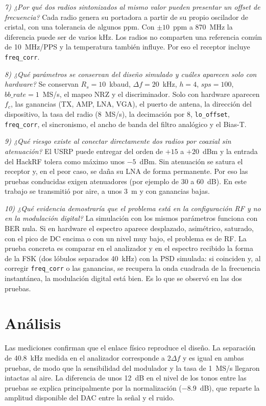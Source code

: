 \documentclass[conference]{IEEEtran}
\begin{document}
\textit{7) ¿Por qué dos radios sintonizados al mismo valor pueden presentar un offset de frecuencia?} Cada radio genera su portadora a partir de su propio oscilador de cristal, con una tolerancia de algunos ppm. Con $\pm 10$~ppm a 870~MHz la diferencia puede ser de varios kHz. Los radios no comparten una referencia común de 10~MHz/PPS y la temperatura también influye. Por eso el receptor incluye \texttt{freq\_corr}.

\textit{8) ¿Qué parámetros se conservan del diseño simulado y cuáles aparecen solo con hardware?} Se conservan $R_s = 10$~kbaud, $\Delta f = 20$~kHz, $h = 4$, $sps = 100$, $bb\_rate = 1$~MS/s, el mapeo NRZ y el discriminador. Solo con hardware aparecen $f_c$, las ganancias (TX, AMP, LNA, VGA), el puerto de antena, la dirección del dispositivo, la tasa del radio (8~MS/s), la decimación por 8, \texttt{lo\_offset}, \texttt{freq\_corr}, el sincronismo, el ancho de banda del filtro analógico y el Bias-T.

\textit{9) ¿Qué riesgo existe al conectar directamente dos radios por coaxial sin atenuación?} El USRP puede entregar del orden de $+15$ a $+20$~dBm y la entrada del HackRF tolera como máximo unos $-5$~dBm. Sin atenuación se satura el receptor y, en el peor caso, se daña su LNA de forma permanente. Por eso las pruebas conducidas exigen atenuadores (por ejemplo de 30 a 60~dB). En este trabajo se transmitió por aire, a unos 3~m y con ganancias bajas.

\textit{10) ¿Qué evidencia demostraría que el problema está en la configuración RF y no en la modulación digital?} La simulación con los mismos parámetros funciona con BER nula. Si en hardware el espectro aparece desplazado, asimétrico, saturado, con el pico de DC encima o con un nivel muy bajo, el problema es de RF. La prueba concreta es comparar en el analizador y en el espectro recibido la forma de la FSK (dos lóbulos separados 40~kHz) con la PSD simulada: si coinciden y, al corregir \texttt{freq\_corr} o las ganancias, se recupera la onda cuadrada de la frecuencia instantánea, la modulación digital está bien. Es lo que se observó en las dos pruebas.

\section{Análisis}

Las mediciones confirman que el enlace físico reproduce el diseño. La separación de 40.8~kHz medida en el analizador corresponde a $2\Delta f$ y es igual en ambas pruebas, de modo que la sensibilidad del modulador y la tasa de 1~MS/s llegaron intactas al aire. La diferencia de unos 12~dB en el nivel de los tonos entre las pruebas se explica principalmente por la normalización ($-8.9$~dB), que reparte la amplitud disponible del DAC entre la señal y el ruido.
\end{document}
